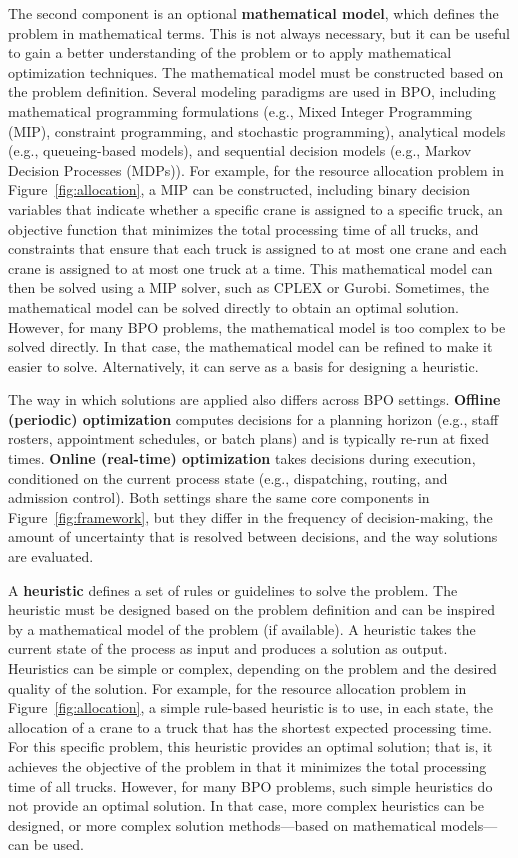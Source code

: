 \documentclass[runningheads]{llncs}
\begin{document}
The second component is an optional \textbf{mathematical model}, which defines the problem in mathematical terms. This is not always necessary, but it can be useful to gain a better understanding of the problem or to apply mathematical optimization techniques. The mathematical model must be constructed based on the problem definition. Several modeling paradigms are used in BPO, including mathematical programming formulations (e.g., Mixed Integer Programming (MIP), constraint programming, and stochastic programming), analytical models (e.g., queueing-based models), and sequential decision models (e.g., Markov Decision Processes (MDPs)). For example, for the resource allocation problem in Figure~\ref{fig:allocation}, a MIP can be constructed, including binary decision variables that indicate whether a specific crane is assigned to a specific truck, an objective function that minimizes the total processing time of all trucks, and constraints that ensure that each truck is assigned to at most one crane and each crane is assigned to at most one truck at a time. This mathematical model can then be solved using a MIP solver, such as CPLEX or Gurobi. Sometimes, the mathematical model can be solved directly to obtain an optimal solution. However, for many BPO problems, the mathematical model is too complex to be solved directly. In that case, the mathematical model can be refined to make it easier to solve. Alternatively, it can serve as a basis for designing a heuristic.

The way in which solutions are applied also differs across BPO settings. \textbf{Offline (periodic) optimization} computes decisions for a planning horizon (e.g., staff rosters, appointment schedules, or batch plans) and is typically re-run at fixed times. \textbf{Online (real-time) optimization} takes decisions during execution, conditioned on the current process state (e.g., dispatching, routing, and admission control). Both settings share the same core components in Figure~\ref{fig:framework}, but they differ in the frequency of decision-making, the amount of uncertainty that is resolved between decisions, and the way solutions are evaluated.

A \textbf{heuristic} defines a set of rules or guidelines to solve the problem. The heuristic must be designed based on the problem definition and can be inspired by a mathematical model of the problem (if available). A heuristic takes the current state of the process as input and produces a solution as output. Heuristics can be simple or complex, depending on the problem and the desired quality of the solution. For example, for the resource allocation problem in Figure~\ref{fig:allocation}, a simple rule-based heuristic is to use, in each state, the allocation of a crane to a truck that has the shortest expected processing time. For this specific problem, this heuristic provides an optimal solution; that is, it achieves the objective of the problem in that it minimizes the total processing time of all trucks. However, for many BPO problems, such simple heuristics do not provide an optimal solution. In that case, more complex heuristics can be designed, or more complex solution methods---based on mathematical models---can be used.
\end{document}
